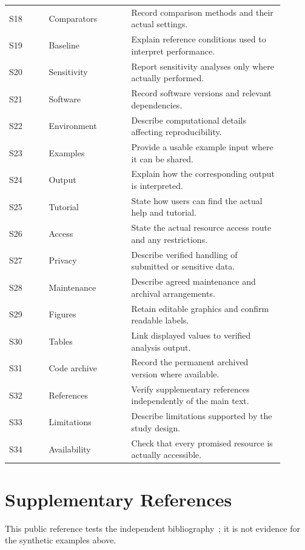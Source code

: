 \documentclass[11pt,a4paper]{article}
\begin{document}
\begin{longtable}{@{}p{0.13\linewidth}p{0.27\linewidth}p{0.50\linewidth}@{}}
S18 & Comparators & Record comparison methods and their actual settings.\\
S19 & Baseline & Explain reference conditions used to interpret performance.\\
S20 & Sensitivity & Report sensitivity analyses only where actually performed.\\
S21 & Software & Record software versions and relevant dependencies.\\
S22 & Environment & Describe computational details affecting reproducibility.\\
S23 & Examples & Provide a usable example input where it can be shared.\\
S24 & Output & Explain how the corresponding output is interpreted.\\
S25 & Tutorial & State how users can find the actual help and tutorial.\\
S26 & Access & State the actual resource access route and any restrictions.\\
S27 & Privacy & Describe verified handling of submitted or sensitive data.\\
S28 & Maintenance & Describe agreed maintenance and archival arrangements.\\
S29 & Figures & Retain editable graphics and confirm readable labels.\\
S30 & Tables & Link displayed values to verified analysis output.\\
S31 & Code archive & Record the permanent archived version where available.\\
S32 & References & Verify supplementary references independently of the main text.\\
S33 & Limitations & Describe limitations supported by the study design.\\
S34 & Availability & Check that every promised resource is actually accessible.\\
\end{longtable}
\normalsize

\section{Supplementary References}
This public reference tests the independent bibliography~\cite{wilkinson2016fair};
it is not evidence for the synthetic examples above.


\end{document}

